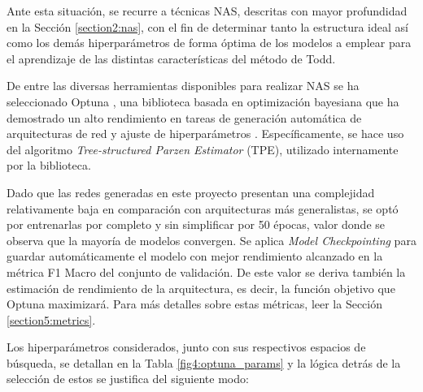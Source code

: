 Ante esta situación, se recurre a técnicas NAS, descritas con mayor profundidad en la Sección \ref{section2:nas}, con el fin de determinar tanto la estructura ideal así como los demás hiperparámetros de forma óptima de los modelos a emplear para el aprendizaje de las distintas características del método de Todd.

De entre las diversas herramientas disponibles para realizar NAS se ha seleccionado Optuna \cite{optuna_2019}, una biblioteca basada en optimización bayesiana que ha demostrado un alto rendimiento en tareas de generación automática de arquitecturas de red y ajuste de hiperparámetros \cite{pizurica_generic_2024}. Específicamente, se hace uso del algoritmo \textit{Tree-structured Parzen Estimator} (TPE), utilizado internamente por la biblioteca. 

Dado que las redes generadas en este proyecto presentan una complejidad relativamente baja en comparación con arquitecturas más generalistas, se optó por entrenarlas por completo y sin simplificar por 50 épocas, valor donde se observa que la mayoría de modelos convergen. Se aplica \textit{Model Checkpointing} para guardar automáticamente el modelo con mejor rendimiento alcanzado en la métrica F1 Macro del conjunto de validación. De este valor se deriva también la estimación de rendimiento de la arquitectura, es decir, la función objetivo que Optuna maximizará. Para más detalles sobre estas métricas, leer la Sección  \ref{section5:metrics}.

Los hiperparámetros considerados, junto con sus respectivos espacios de búsqueda, se detallan en la Tabla \ref{fig4:optuna_params} y la lógica detrás de la selección de estos se justifica del siguiente modo:


